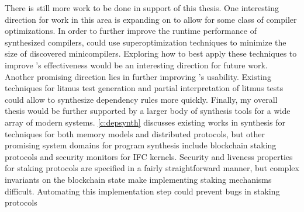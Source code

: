 There is still more work to be done in support of this thesis.
One interesting direction for work in this area is expanding on \jitsynth
to allow for some class of compiler optimizations.
In order to further improve the runtime performance of synthesized compilers,
\jitsynth could use superoptimization techniques to minimize the size
of discovered minicompilers.
Exploring how to best apply these techniques to improve \jitsynth's effectiveness
would be an interesting direction for future work.
Another promising direction lies in further improving \depsynth's usability.
Existing techniques for litmus test generation and partial interpretation of litmus tests
could allow \depsynth to synthesize dependency rules more quickly.
Finally, my overall thesis would be further supported by a larger
body of synthesis tools for a wide array of modern systems.
\cref{c:depsynth} discusses existing works in synthesis for
techniques for both memory models and distributed protocols,
but other promising system domains for program synthesis %
include blockchain staking protocols and security monitors for IFC kernels.
Security and liveness properties for staking protocols are specified in a fairly straightforward manner,
but complex invariants on the blockchain state make implementing staking mechanisms difficult.
Automating this implementation step could prevent bugs in staking protocols
